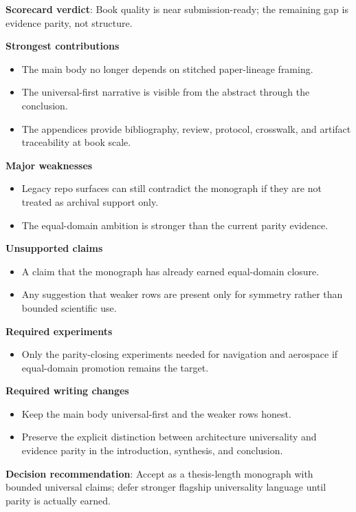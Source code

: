 \textbf{Scorecard verdict}: Book quality is near submission-ready; the remaining gap is evidence parity, not structure.

\textbf{Strongest contributions}
\begin{itemize}
\item The main body no longer depends on stitched paper-lineage framing.
\item The universal-first narrative is visible from the abstract through the conclusion.
\item The appendices provide bibliography, review, protocol, crosswalk, and artifact traceability at book scale.
\end{itemize}
\textbf{Major weaknesses}
\begin{itemize}
\item Legacy repo surfaces can still contradict the monograph if they are not treated as archival support only.
\item The equal-domain ambition is stronger than the current parity evidence.
\end{itemize}
\textbf{Unsupported claims}
\begin{itemize}
\item A claim that the monograph has already earned equal-domain closure.
\item Any suggestion that weaker rows are present only for symmetry rather than bounded scientific use.
\end{itemize}
\textbf{Required experiments}
\begin{itemize}
\item Only the parity-closing experiments needed for navigation and aerospace if equal-domain promotion remains the target.
\end{itemize}
\textbf{Required writing changes}
\begin{itemize}
\item Keep the main body universal-first and the weaker rows honest.
\item Preserve the explicit distinction between architecture universality and evidence parity in the introduction, synthesis, and conclusion.
\end{itemize}
\textbf{Decision recommendation}: Accept as a thesis-length monograph with bounded universal claims; defer stronger flagship universality language until parity is actually earned.

